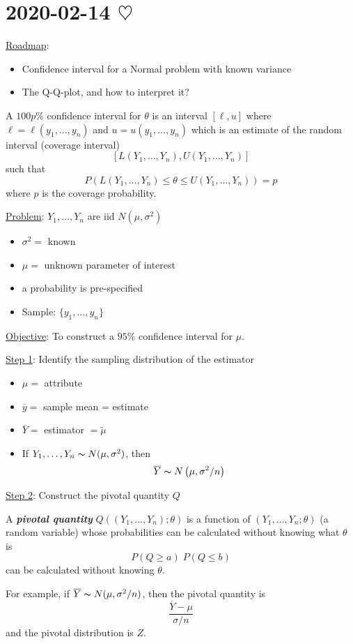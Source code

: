 \section{2020-02-14 \texorpdfstring{$\heartsuit$}{[Valentine's Day!]}}

\underline{Roadmap}:
\begin{itemize}
    \item Confidence interval for a Normal problem with known variance
    \item The Q-Q-plot, and how to interpret it?
\end{itemize}
\begin{defbox}
    \begin{definition}
        A $ 100p\% $ confidence interval for $ \theta $ is an interval $
            [\ell,u] $ where $ \ell=\ell(y_1,\ldots ,y_n) $ and $ u=u(y_1,\ldots
            ,y_n) $ which is an estimate of the random interval (coverage interval)
        \[ \left[ L(Y_1,\ldots ,Y_n),U(Y_1,\ldots ,Y_n) \right] \] such that
        \[ P\left( L(Y_1,\ldots ,Y_n)\leqslant \theta\leqslant U(Y_1,\ldots
            ,Y_n) \right)=p \] where $ p $ is the coverage probability.
    \end{definition}
\end{defbox}
\underline{Problem}:  $ Y_1,\ldots ,Y_n $ are iid $ N(\mu,\sigma^2) $
\begin{itemize}
    \item $ \sigma^2= $ known
    \item $ \mu= $ unknown parameter of interest
    \item a probability is pre-specified
    \item Sample: $ \{y_1,\ldots ,y_n\} $
\end{itemize}
\underline{Objective}: To construct a $ 95\% $ confidence interval for $ \mu $.

\underline{Step 1}: Identify the sampling distribution of the estimator
\begin{itemize}
    \item $ \mu= $ attribute
    \item $ \overline{y}= $ sample mean = estimate
    \item $ \overline{Y}= $ estimator $ = \tilde{\mu} $
    \item If $ Y_1,\ldots ,Y_n \thicksim N(\mu,\sigma^2) $, then
          \[ \overline{Y} \thicksim N\left( \mu,\sigma^2/n \right) \]
\end{itemize}
\underline{Step 2}: Construct the pivotal quantity $ Q $
\begin{defbox}
    \begin{definition}
        A \textbf{\emph{pivotal quantity}} $ Q((Y_1,\ldots ,Y_n);\theta) $ is a
        function of $ \left( Y_1,\ldots ,Y_n;\theta \right) $ (a random
        variable) whose probabilities can be calculated without knowing what $
            \theta $ is
        \[ P(Q\geqslant a)\; P(Q\leqslant b) \] can be calculated without
        knowing $ \theta $.
    \end{definition}
\end{defbox}
For example, if $ \overline{Y} \thicksim N(\mu,\sigma^2/n) $, then the pivotal
quantity is
\[ \frac{\overline{Y}-\mu}{\sigma/n} \] and the pivotal distribution is $ Z $.

